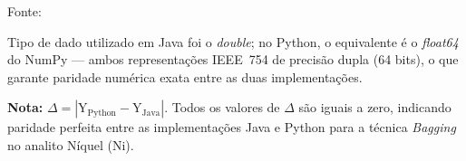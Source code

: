 \begin{table}[H]
\begin{threeparttable}
\begin{center}
\begin{minipage}{0.85\linewidth}
\begin{tablenotes}
\footnotesize
\item Fonte:~\oautor
\item[a] Tipo de dado utilizado em Java foi o \textit{double}; no Python,
o equivalente é o \textit{float64} do NumPy — ambos representações IEEE~754
de precisão dupla (64 bits), o que garante paridade numérica exata entre as
duas implementações.
\item \textbf{Nota:} $\Delta = |\text{Y}_{\text{Python}} - \text{Y}_{\text{Java}}|$.
Todos os valores de $\Delta$ são iguais a zero, indicando paridade
perfeita entre as implementações Java e Python para a técnica \textit{Bagging}
no analito Níquel (Ni).
\end{tablenotes}
\end{minipage}
\end{center}
\end{threeparttable}
\end{table}

